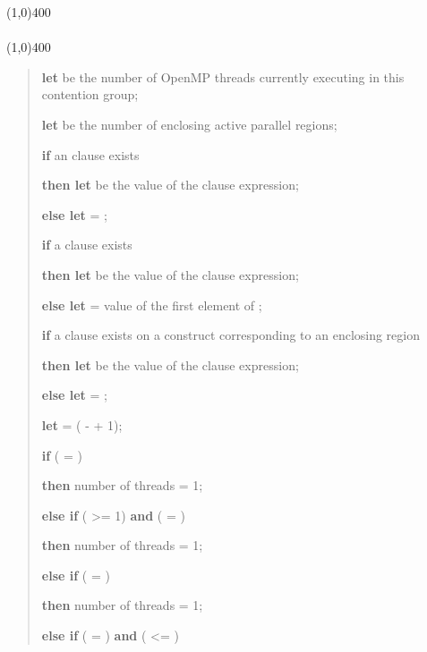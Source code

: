\begin{samepage}
\nolinenumbers\line(1,0){400}\\[.4\baselineskip]
\\[-0.5\baselineskip]
\line(1,0){400}\linenumbers

\begin{quote}
\textbf{let}  be the number of OpenMP threads currently executing in
this contention group;

\textbf{let}  be the number of enclosing active parallel regions;

\textbf{if} an  clause exists

\textbf{then let}  be the value of the  clause expression;

\textbf{else let}  = ;

\textbf{if} a  clause exists

\textbf{then let}  be the value of the  clause
expression;

\textbf{else let}  = value of the first element of ;

\textbf{if} a  clause exists on a  construct corresponding to an enclosing  region

\textbf{then let}  be the value of the  clause expression;

\textbf{else let}  = ;

\textbf{let}  = ( -  + 1);

\textbf{if} ( = )

\textbf{then} number of threads = 1;

\textbf{else if} ( >= 1) \textbf{and} ( = )

\textbf{then} number of threads = 1;

\textbf{else if} ( = )

\textbf{then} number of threads = 1;

\textbf{else if} ( = ) \textbf{and} ( <= )


\end{quote}
\end{samepage}
